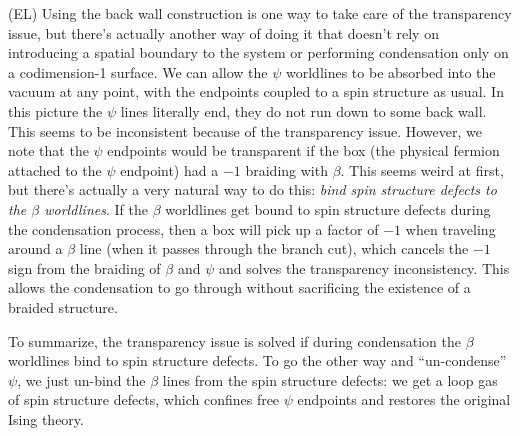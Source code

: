 \documentclass[12pt,a4paper]{article}
\newcommand{\ethan}[1]{{\color{amethyst}\footnotesize{(EL) #1}}}
\newcommand{\PsiEnd}{\mathord{\vcenter{\hbox{\texttt{[image: PsiEnd.pdf]}}}}}
\begin{document}
\ethan{Using the back wall construction is one way to take care of the transparency issue, but there's actually another way of doing it that doesn't rely on introducing a spatial boundary to the system or performing condensation only on a codimension-1 surface. 
We can allow the $\psi$ worldlines to be absorbed into the vacuum at any point, with the endpoints coupled to a spin structure as usual. 
In this picture the $\psi$ lines literally end, they do not run down to some back wall. 
This seems to be inconsistent because of the transparency issue. 
However, we note that the $\psi$ endpoints would be transparent if the box (the physical fermion attached to the $\psi$ endpoint) had a $-1$ braiding with $\beta$. 
This seems weird at first, but there's actually a very natural way to do this: {\it bind spin structure defects to the $\beta$ worldlines}. 
If the $\beta$ worldlines get bound to spin structure defects during the condensation process, then a box will pick up a factor of $-1$ when traveling around a $\beta$ line (when it passes through the branch cut), which cancels the $-1$ sign from the braiding of $\beta$ and $\psi$ and solves the transparency inconsistency. 
This allows the condensation to go through without sacrificing the existence of a braided structure. 

To summarize, the transparency issue is solved if during condensation the $\beta$ worldlines bind to spin structure defects. 
To go the other way and ``un-condense'' $\psi$, we just un-bind the $\beta$ lines from the spin structure defects: we get a loop gas of spin structure defects, which confines free $\psi$ endpoints and restores the original Ising theory. } 

\end{document}
